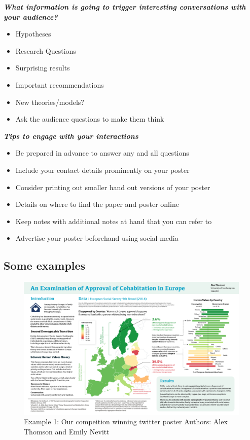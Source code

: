 \documentclass[
  titlepage]{book}
\providecommand{\tightlist}{%
  \setlength{\itemsep}{0pt}\setlength{\parskip}{0pt}}
\begin{document}
\textbf{\emph{What information is going to trigger interesting conversations with your audience?}}

\begin{itemize}
\tightlist
\item
  Hypotheses
\item
  Research Questions
\item
  Surprising results
\item
  Important recommendations
\item
  New theories/models?
\item
  Ask the audience questions to make them think
\end{itemize}

\textbf{\emph{Tips to engage with your interactions}}

\begin{itemize}
\tightlist
\item
  Be prepared in advance to answer any and all questions
\item
  Include your contact details prominently on your poster
\item
  Consider printing out smaller hand out versions of your poster
\item
  Details on where to find the paper and poster online
\item
  Keep notes with additional notes at hand that you can refer to
\item
  Advertise your poster beforehand using social media
\end{itemize}

\hypertarget{some-examples}{%
\subsection{Some examples}\label{some-examples}}

\begin{figure}
\centering
\includegraphics{img/YISA Poster 2020.png}
\caption{Example 1: Our compeition winning twitter poster Authors: Alex Thomson and Emily Nevitt}
\end{figure}
\end{document}
